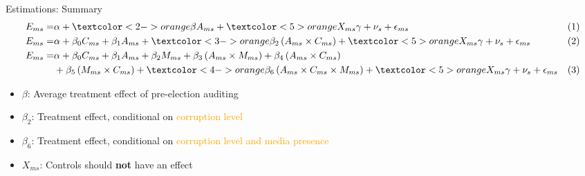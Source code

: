\begin{frame}{Estimations: Summary}
    \begin{align*}
        E_{ms} =& \alpha + \textcolor<2->{orange}{\beta}A_{ms} + \textcolor<5>{orange}{X_{ms}}\gamma + \nu_s+ \epsilon_{ms} &(1)\\
        E_{ms} =& \alpha + \beta_0 C_{ms} + \beta_1 A_{ms} + \textcolor<3->{orange}{\beta_2} \left(A_{ms}\times C_{ms}\right) + \textcolor<5>{orange}{X_{ms}}\gamma + \nu_s + \epsilon_{ms} & (2)\\
        E_{ms} =& \alpha + \beta_0C_{ms} + \beta_1 A_{ms} + \beta_2 M_{ms} + \beta_3 \left(A_{ms}\times M_{ms}\right) + \beta_4\left(A_{ms}\times C_{ms}\right)\\
        & + \beta_5 \left(M_{ms}\times C_{ms}\right) + \textcolor<4->{orange}{\beta_6} \left( A_{ms}\times C_{ms}\times M_{ms} \right) + \textcolor<5>{orange}{X_{ms}}\gamma+\nu_s +\epsilon_{ms} & (3)
    \end{align*}

    \begin{itemize}
        \small
        \item<2-> $\beta$: Average treatment effect of pre-election auditing
        \item<3-> $\beta_2$: Treatment effect, conditional on \textcolor<3->{orange}{corruption level}
        \item<4-> $\beta_6$: Treatment effect, conditional on \textcolor<4->{orange}{corruption level and media presence}
        \item<5-> $X_{ms}$: Controls should \textbf{\color{orange}not} have an effect
    \end{itemize}
    
\end{frame}